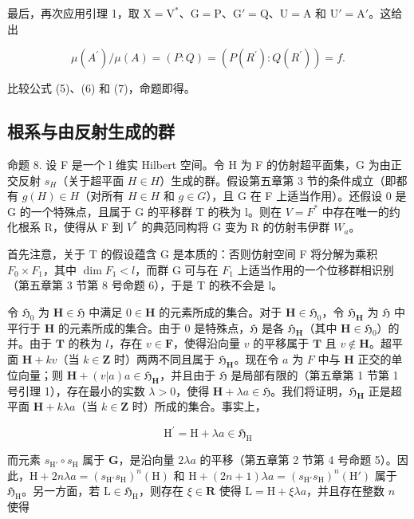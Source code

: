 最后，再次应用引理 1，取 \(\mathrm{X} = \mathrm{V}^*\)、\(\mathrm{G} = \mathrm{P}\)、\(\mathrm{G}' = \mathrm{Q}\)、\(\mathrm{U} = \mathrm{A}\) 和 \(\mathrm{U}' = \mathrm{A}'\)。这给出

\[
\mu (A ^ {\prime}) / \mu (A) = (P: Q) = (P (R ^ {\prime}): Q (R ^ {\prime})) = f.\tag{7}
\]

比较公式 (5)、(6) 和 (7)，命题即得。

\subsection{根系与由反射生成的群}

命题 8. 设 F 是一个 l 维实 Hilbert 空间。令 H 为 F 的仿射超平面集，G 为由正交反射 \(s_{H}\)（关于超平面 \(H \in H\)）生成的群。假设第五章第 3 节的条件成立（即都有 \(g(H) \in H\)（对所有 \(H \in H\) 和 \(g \in G\)），且 G 在 F 上适当作用）。还假设 0 是 G 的一个特殊点，且属于 G 的平移群 T 的秩为 l。则在 \(V = F^{*}\) 中存在唯一的约化根系 R，使得从 F 到 \(V^{*}\) 的典范同构将 G 变为 R 的仿射韦伊群 \(W_{a}\)。

首先注意，关于 T 的假设蕴含 G 是本质的：否则仿射空间 F 将分解为乘积 \(F_{0} \times F_{1}\)，其中 \(\dim F_{1} < l\)，而群 G 可与在 \(F_{1}\) 上适当作用的一个位移群相识别（第五章第 3 节第 8 号命题 6），于是 T 的秩不会是 l。

令 \(\mathfrak{H}_0\) 为 \(\mathbf{H} \in \mathfrak{H}\) 中满足 \(0 \in \mathbf{H}\) 的元素所成的集合。对于 \(\mathbf{H} \in \mathfrak{H}_0\)，令 \(\mathfrak{H}_{\mathbf{H}}\) 为 \(\mathfrak{H}\) 中平行于 \(\mathbf{H}\) 的元素所成的集合。由于 0 是特殊点，\(\mathfrak{H}\) 是各 \(\mathfrak{H}_{\mathbf{H}}\)（其中 \(\mathbf{H} \in \mathfrak{H}_0\)）的并。由于 \(\mathbf{T}\) 的秩为 \(l\)，存在 \(v \in \mathbf{F}\)，使得沿向量 \(v\) 的平移属于 \(\mathbf{T}\) 且 \(v \notin \mathbf{H}\)。超平面 \(\mathbf{H} + kv\)（当 \(k \in \mathbf{Z}\) 时）两两不同且属于 \(\mathfrak{H}_{\mathbf{H}}\)。现在令 \(a\) 为 \(F\) 中与 \(\mathbf{H}\) 正交的单位向量；则 \(\mathbf{H} + (v|a)a \in \mathfrak{H}_{\mathbf{H}}\)，并且由于 \(\mathfrak{H}\) 是局部有限的（第五章第 1 节第 1 号引理 1），存在最小的实数 \(\lambda > 0\)，使得 \(\mathbf{H} + \lambda a \in \mathfrak{H}\)。我们将证明，\(\mathfrak{H}_{\mathbf{H}}\) 正是超平面 \(\mathbf{H} + k\lambda a\)（当 \(k \in \mathbf{Z}\) 时）所成的集合。事实上，

\[
\mathrm{H} ^ {\prime} = \mathrm{H} + \lambda a \in \mathfrak {H} _ {\mathrm{H}}
\]

而元素 \(s_{\mathrm{H}'} \circ s_{\mathrm{H}}\) 属于 \(\mathbf{G}\)，是沿向量 \(2\lambda a\) 的平移（第五章第 2 节第 4 号命题 5）。因此，\(\mathrm{H} + 2n\lambda a = (s_{\mathrm{H}'}s_{\mathrm{H}})^n(\mathrm{H})\) 和 \(\mathrm{H} + (2n + 1)\lambda a = (s_{\mathrm{H}'}s_{\mathrm{H}})^n(\mathrm{H}')\) 属于 \(\mathfrak{H}_{\mathrm{H}}\)。另一方面，若 \(\mathrm{L} \in \mathfrak{H}_{\mathrm{H}}\)，则存在 \(\xi \in \mathbf{R}\) 使得 \(\mathrm{L} = \mathrm{H} + \xi \lambda a\)，并且存在整数 \(n\) 使得

